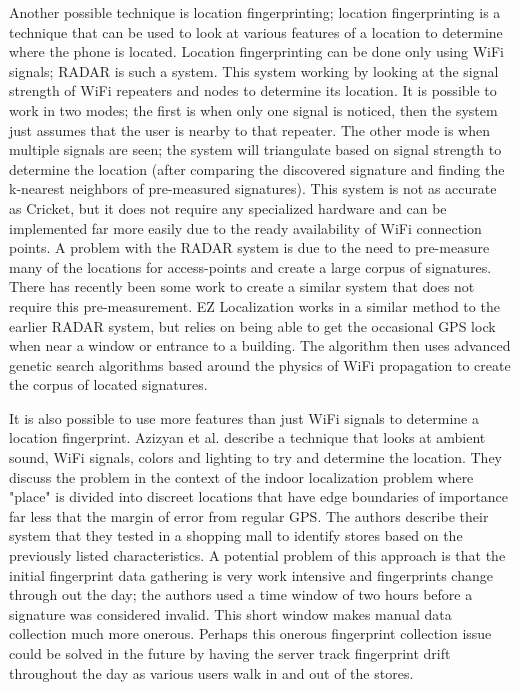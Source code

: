 \documentclass{acm_proc_article-sp}
\begin{document}
Another possible technique is location fingerprinting; location fingerprinting is a technique that can be used to look at various features of a location to determine where the phone is located. Location fingerprinting can be done only using WiFi signals; RADAR \cite{bahl2000radar} is such a system.  This system working by looking at the signal strength of WiFi repeaters and nodes to determine its location. It is possible to work in two modes; the first is when only one signal is noticed, then the system just assumes that the user is nearby to that repeater.  The other mode is when multiple signals are seen; the system will triangulate based on signal strength to determine the location (after comparing the discovered signature and finding the k-nearest neighbors of pre-measured signatures).  This system is not as accurate as Cricket, but it does not require any specialized hardware and can be implemented far more easily due to the ready availability of WiFi connection points.  \cite{bahl2000radar}  A problem with the RADAR system is due to the need to pre-measure many of the locations for access-points and create a large corpus of signatures. There has recently been some work to create a similar system that does not require this pre-measurement.  EZ Localization works in a similar method to the earlier RADAR system, but relies on being able to get the occasional GPS lock when near a window or entrance to a building. The algorithm then uses advanced genetic search algorithms based around the physics of WiFi propagation to create the corpus of located signatures.  \cite{chintalapudi2010indoor}

It is also possible to use more features than just WiFi signals to determine a location fingerprint. Azizyan et al. describe a technique that looks at ambient sound, WiFi signals, colors and lighting to try and determine the location.   They discuss the problem in the context of the indoor localization problem where "place" is divided into discreet locations that have edge boundaries of importance far less that the margin of error from regular GPS.  The authors describe their system that they tested in a shopping mall to identify stores based on the previously listed characteristics.  A potential problem of this approach is that the initial fingerprint data gathering is very work intensive and fingerprints change through out the day; the authors used a time window of two hours before a signature was considered invalid.  This short window makes manual data collection much more onerous. \cite{azizyan2009surroundsense}  Perhaps this onerous fingerprint collection issue could be solved in the future by having the server track fingerprint drift throughout the day as various users walk in and out of the stores.
\end{document}
